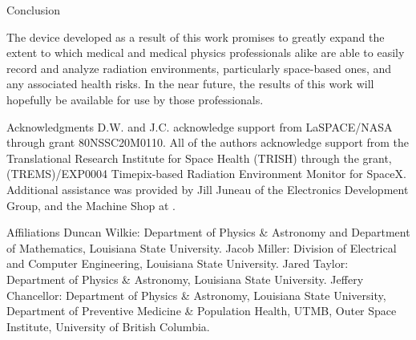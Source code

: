 \documentclass{beamer}
\begin{document}
\begin{frame}
\begin{columns}[t]
\begin{column}{0.24\linewidth}
      \begin{block}{Conclusion}

        The device developed as a result of this work promises to greatly expand the extent to which medical and medical physics professionals alike are able to easily record and analyze radiation environments, particularly space-based ones, and any associated health risks. In the near future, the results of this work will hopefully be available for use by those professionals.
      \end{block}

      \begin{block}{Acknowledgments}
        D.W. and J.C. acknowledge support from LaSPACE/NASA through grant 80NSSC20M0110. All of the authors acknowledge support from the Translational Research Institute for Space Health (TRISH) through the grant, (TREMS)/EXP0004 Timepix-based Radiation Environment Monitor for SpaceX. Additional assistance was provided by Jill Juneau of the Electronics Development Group, and the Machine Shop at .
      \end{block}
      \begin{block}{Affiliations}
        Duncan Wilkie: Department of Physics \& Astronomy and Department of Mathematics, Louisiana State University.
        Jacob Miller: Division of Electrical and Computer Engineering, Louisiana State University.
        Jared Taylor: Department of Physics \& Astronomy, Louisiana State University.
        Jeffery Chancellor:  Department of Physics \& Astronomy, Louisiana State University, Department of Preventive Medicine \& Population Health, UTMB, Outer Space Institute, University of British Columbia.

      \end{block}


    \end{column}
  \end{columns}
\end{frame}
\end{document}
